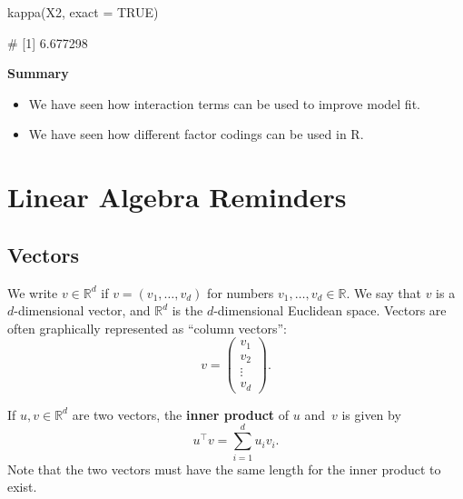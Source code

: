 \documentclass[
  a4paper,
]{article}
\newenvironment{Shaded}{\begin{snugshade}}{\end{snugshade}}
\newcommand{\AttributeTok}[1]{\textcolor[rgb]{0.77,0.63,0.00}{#1}}
\newcommand{\ConstantTok}[1]{\textcolor[rgb]{0.00,0.00,0.00}{#1}}
\newcommand{\FunctionTok}[1]{\textcolor[rgb]{0.00,0.00,0.00}{#1}}
\newcommand{\NormalTok}[1]{#1}
\providecommand{\tightlist}{%
  \setlength{\itemsep}{0pt}\setlength{\parskip}{0pt}}
\theoremstyle{definition}
\theoremstyle{definition}
\theoremstyle{definition}
\theoremstyle{definition}
\theoremstyle{remark}
\begin{document}
\begin{Shaded}
\begin{Highlighting}[]
\FunctionTok{kappa}\NormalTok{(X2, }\AttributeTok{exact =} \ConstantTok{TRUE}\NormalTok{)}
\end{Highlighting}
\end{Shaded}

\begin{Shaded}
\begin{Highlighting}[]
\NormalTok{\# [1] 6.677298}
\end{Highlighting}
\end{Shaded}

\textbf{Summary}

\begin{itemize}
\tightlist
\item
  We have seen how interaction terms can be used to improve model
  fit.
\item
  We have seen how different factor codings can be used in R.
\end{itemize}

\clearpage

\hypertarget{appendix-appendices}{%
\appendix}


\hypertarget{Sx1-matrices}{%
\section{Linear Algebra Reminders}\label{Sx1-matrices}}

\hypertarget{vectors}{%
\subsection{Vectors}\label{vectors}}

We write \(v \in \mathbb{R}^d\) if \(v = (v_1, \ldots, v_d)\) for numbers
\(v_1, \ldots, v_d \in\mathbb{R}\). We say that \(v\) is a \(d\)-dimensional vector,
and \(\mathbb{R}^d\) is the \(d\)-dimensional Euclidean space. Vectors are
often graphically represented as ``column vectors'':
\begin{equation*}
  v = \begin{pmatrix}
      v_1 \\ v_2 \\ \vdots \\ v_d
  \end{pmatrix}.
\end{equation*}

If \(u,v\in\mathbb{R}^d\) are two vectors, the \textbf{inner product} of \(u\) and~\(v\)
is given by
\begin{equation}
  u^\top v
  = \sum_{i=1}^d u_i v_i.  \label{eq:inner-product}
\end{equation}
Note that the two vectors must have the same length for the inner product
to exist.
\end{document}
